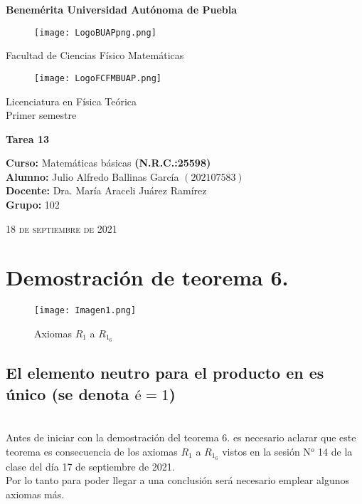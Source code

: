 \documentclass[12pt]{article}
\begin{document}
\thispagestyle{empty} 
\begin{center} \LARGE{\bf Benemérita Universidad Autónoma de Puebla} \\[0.5cm]
\begin{figure}[htb] \centering \texttt{[image: LogoBUAPpng.png]} \end{figure}
\LARGE{Facultad de Ciencias Físico Matemáticas}\\[0.5cm]
\begin{figure}[htb] \centering \texttt{[image: LogoFCFMBUAP.png]} \end{figure} 
\Large{Licenciatura en Física Teórica}\\[0.5cm]
\large{Primer semestre} \end{center}
\begin{center} { \Large \bfseries{Tarea 13}} \\ \end{center}
\large{\bf Curso:} Matemáticas básicas \textbf{(N.R.C.:25598)}\\
\large{\bf Alumno:} Julio Alfredo Ballinas García $\left(202107583\right)$ \\
\large{\bf Docente:} Dra. María Araceli Juárez Ramírez\\
\large{\bf Grupo:} 102\\ \begin{center} 
\vfill
\textsc{18 de septiembre de 2021} \end{center}  
\newpage
\sffamily
\section{Demostración de teorema 6.}

\begin{figure}[htb] \centering \texttt{[image: Imagen1.png]}
\caption{Axiomas $R_1$ a $R_1_6$}
\end{figure}
\subsection{El elemento neutro para el producto en  es único (se denota $é=1$)}\\

Antes de iniciar con la demostración del teorema 6. es necesario aclarar que este teorema es consecuencia de los axiomas $R_1$ a $R_1_6$ vistos en la sesión N$^{o}$ 14 de la clase del día 17 de septiembre de 2021. \\

Por lo tanto para poder llegar a una conclusión será necesario emplear algunos axiomas más. 
\end{document}
